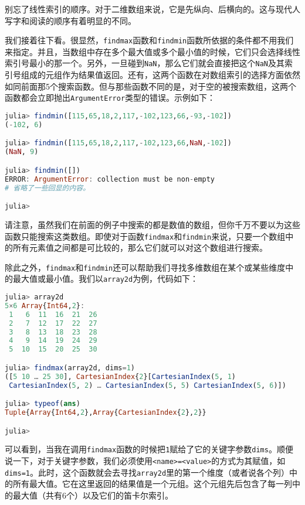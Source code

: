 别忘了线性索引的顺序。对于二维数组来说，它是先纵向、后横向的。这与现代人写字和阅读的顺序有着明显的不同。

我们接着往下看。很显然，\verb`findmax`函数和\verb`findmin`函数所依据的条件都不用我们来指定。并且，当数组中存在多个最大值或多个最小值的时候，它们只会选择线性索引号最小的那一个。另外，一旦碰到\verb`NaN`，那么它们就会直接把这个\verb`NaN`及其索引号组成的元组作为结果值返回。还有，这两个函数在对数组索引的选择方面依然如同前面那5个搜索函数。但与那些函数不同的是，对于空的被搜索数组，这两个函数都会立即抛出\verb`ArgumentError`类型的错误。示例如下：

\begin{lstlisting}[language=julia]
julia> findmin([115,65,18,2,117,-102,123,66,-93,-102])
(-102, 6)

julia> findmin([115,65,18,2,117,-102,123,66,NaN,-102])
(NaN, 9)

julia> findmin([])
ERROR: ArgumentError: collection must be non-empty
# 省略了一些回显的内容。

julia> 
\end{lstlisting}

请注意，虽然我们在前面的例子中搜索的都是数值的数组，但你千万不要以为这些函数只能搜索这类数组。即使对于函数\verb`findmax`和\verb`findmin`来说，只要一个数组中的所有元素值之间都是可比较的，那么它们就可以对这个数组进行搜索。

除此之外，\verb`findmax`和\verb`findmin`还可以帮助我们寻找多维数组在某个或某些维度中的最大值或最小值。我们以\verb`array2d`为例，代码如下：

\begin{lstlisting}[language=julia]
julia> array2d
5×6 Array{Int64,2}:
 1   6  11  16  21  26
 2   7  12  17  22  27
 3   8  13  18  23  28
 4   9  14  19  24  29
 5  10  15  20  25  30

julia> findmax(array2d, dims=1)
([5 10 … 25 30], CartesianIndex{2}[CartesianIndex(5, 1)
 CartesianIndex(5, 2) … CartesianIndex(5, 5) CartesianIndex(5, 6)])

julia> typeof(ans)
Tuple{Array{Int64,2},Array{CartesianIndex{2},2}}

julia> 
\end{lstlisting}

可以看到，当我在调用\verb`findmax`函数的时候把\verb`1`赋给了它的关键字参数\verb`dims`。顺便说一下，对于关键字参数，我们必须使用\verb`<name>=<value>`的方式为其赋值，如\verb`dims=1`。此时，这个函数就会去寻找\verb`array2d`里的第一个维度（或者说各个列）中的所有最大值。它在这里返回的结果值是一个元组。这个元组先后包含了每一列中的最大值（共有6个）以及它们的笛卡尔索引。

